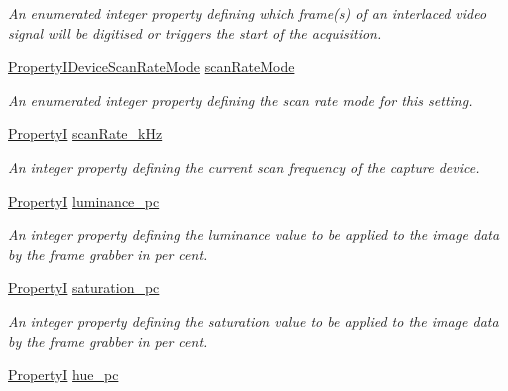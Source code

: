 \begin{DoxyCompactItemize}
\begin{DoxyCompactList}\small\item\em An enumerated integer property defining which frame(s) of an interlaced video signal will be digitised or triggers the start of the acquisition. \end{DoxyCompactList}\item 
\hyperlink{group___device_specific_interface_gaec7b599c0645e2ee61b6be26320ae04e}{Property\+I\+Device\+Scan\+Rate\+Mode} \hyperlink{classmv_i_m_p_a_c_t_1_1acquire_1_1_camera_settings_frame_grabber_aa05a4927e747ee08384c74a348a63b6c}{scan\+Rate\+Mode}
\begin{DoxyCompactList}\small\item\em An enumerated integer property defining the scan rate mode for this setting. \end{DoxyCompactList}\item 
\hyperlink{group___common_interface_ga12d5e434238ca242a1ba4c6c3ea45780}{Property\+I} \hyperlink{classmv_i_m_p_a_c_t_1_1acquire_1_1_camera_settings_frame_grabber_ad902ed2dd56b7d24fd03f9b27449dcf8}{scan\+Rate\+\_\+k\+Hz}
\begin{DoxyCompactList}\small\item\em An integer property defining the current scan frequency of the capture device. \end{DoxyCompactList}\item 
\hyperlink{group___common_interface_ga12d5e434238ca242a1ba4c6c3ea45780}{Property\+I} \hyperlink{classmv_i_m_p_a_c_t_1_1acquire_1_1_camera_settings_frame_grabber_aa00a4ef7269a28b048cdec911560600c}{luminance\+\_\+pc}
\begin{DoxyCompactList}\small\item\em An integer property defining the luminance value to be applied to the image data by the frame grabber in per cent. \end{DoxyCompactList}\item 
\hyperlink{group___common_interface_ga12d5e434238ca242a1ba4c6c3ea45780}{Property\+I} \hyperlink{classmv_i_m_p_a_c_t_1_1acquire_1_1_camera_settings_frame_grabber_a5dd508932fef6e7843991055e4af8a85}{saturation\+\_\+pc}
\begin{DoxyCompactList}\small\item\em An integer property defining the saturation value to be applied to the image data by the frame grabber in per cent. \end{DoxyCompactList}\item 
\hyperlink{group___common_interface_ga12d5e434238ca242a1ba4c6c3ea45780}{Property\+I} \hyperlink{classmv_i_m_p_a_c_t_1_1acquire_1_1_camera_settings_frame_grabber_ac6086e7d04fa208f43c0d146de499714}{hue\+\_\+pc}

\end{DoxyCompactItemize}
